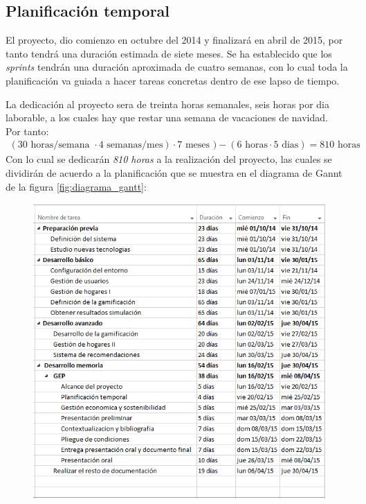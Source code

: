 \subsection{Planificación temporal}\label{sec:planning}
El proyecto, dio comienzo en octubre del 2014 y finalizará en abril de 2015, por tanto tendrá una duración estimada de siete meses. Se ha establecido que los \textit{sprints} tendrán una duración aproximada de cuatro semanas, con lo cual toda la planificación va guiada a hacer tareas concretas dentro de ese lapso de tiempo. 

La dedicación al proyecto sera de treinta horas semanales, seis horas por dia laborable, a los cuales hay que restar una semana de vacaciones de navidad. \\
Por tanto: 
\begin{eqnarray} 
(30 \mbox{ horas/semana } \cdot 4 \mbox{ semanas/mes}) \cdot  7 \mbox{ meses }) - (6 \mbox{ horas}\cdot 5\mbox{ dias}) = 810 \mbox{ horas}
\end{eqnarray}
Con lo cual se dedicarán \textit{810 horas} a la realización del proyecto, las cuales se dividirán de acuerdo a la planificación que se muestra en el diagrama de Gannt de la figura \ref{fig:diagrama_gantt}:

\begin{figure}[ht]
    \centering
    \includegraphics*[scale=0.75]{GEP/planning/tablaPlanning.png}
\end{figure}

